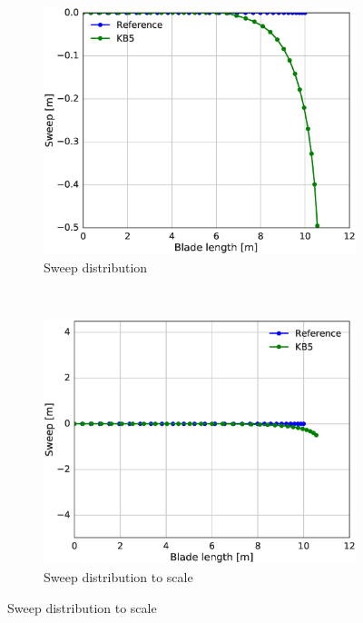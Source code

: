 
\begin{figure}[tph]
\begin{subfigure}{0.50\textwidth}
\includegraphics[width=\linewidth]{figures/KB6_final/KB5_sweep.eps}
\caption{Sweep distribution}
\label{subfig:KB5_sweep}
\end{subfigure}
 ~
\begin{subfigure}{0.50\textwidth}
\includegraphics[width=\linewidth]{figures/KB6_final/KB5_sweep_scale.eps}
\caption{Sweep distribution to scale}
\label{subfig:KB5_sweep_scale}
\end{subfigure}


\end{figure}
